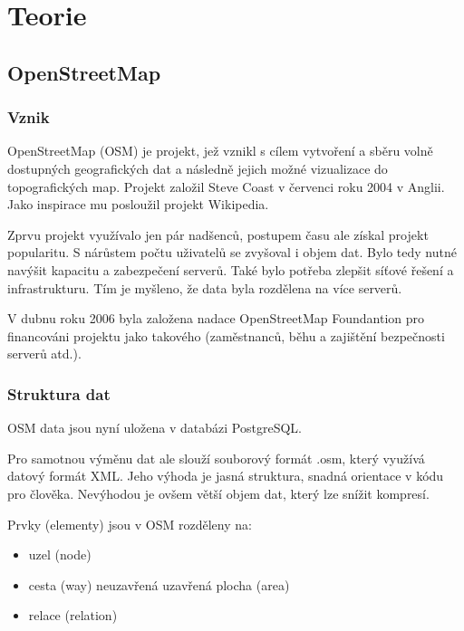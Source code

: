 \chapter{Teorie}
\label{2-Teorie}

\section{OpenStreetMap}
\label{OpenStreetMap}

\subsection{Vznik}
\label{vznik}
OpenStreetMap (OSM) je projekt, jež vznikl s cílem vytvoření a sběru 
volně dostupných geografických dat a následně jejich možné vizualizace
do topografických map. Projekt založil Steve Coast v červenci roku 
2004 v Anglii. Jako inspirace mu posloužil projekt Wikipedia.

Zprvu projekt využívalo jen pár nadšenců, postupem času ale získal
projekt popularitu. S nárůstem počtu uživatelů se zvyšoval i objem dat.
Bylo tedy nutné navýšit kapacitu a zabezpečení serverů.
Také bylo potřeba zlepšit síťové řešení a infrastrukturu.
Tím je myšleno, že data byla rozdělena na více serverů.

V dubnu roku 2006 byla založena nadace OpenStreetMap Foundantion pro financováni 
projektu jako takového (zaměstnanců, běhu a zajištění bezpečnosti serverů atd.). \cite{wikiOSM}

\subsection{Struktura dat}
\label{struktura dat}
OSM data jsou nyní uložena v databázi PostgreSQL. \cite{OSMserver}

Pro samotnou výměnu dat ale slouží souborový formát {.osm}, který využívá datový
formát  XML. 
Jeho výhoda je jasná struktura, snadná orientace v kódu pro člověka. 
Nevýhodou je ovšem větší objem dat, který lze snížit kompresí. 

Prvky (elementy) jsou v OSM rozděleny na:
\begin{itemize}
    \item uzel (node) 
    \item cesta (way)
        \subitem neuzavřená
        \subitem uzavřená
        \subitem plocha (area)
    \item relace (relation) 
\end{itemize}

